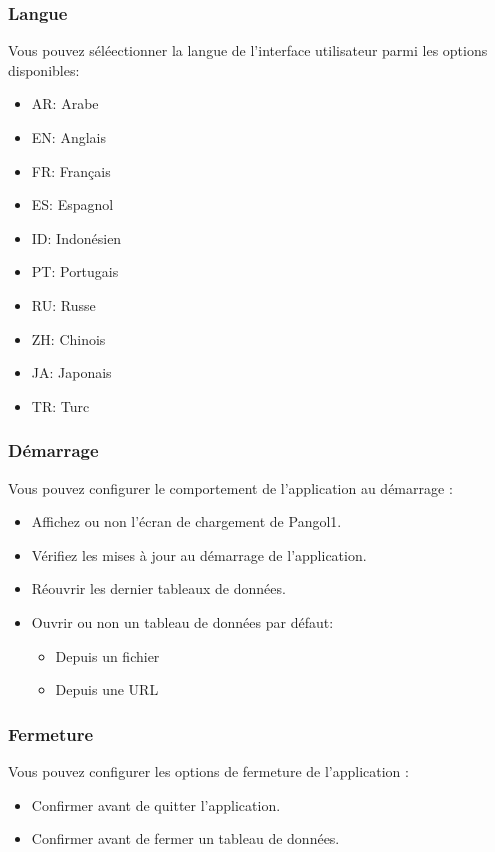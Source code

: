 \documentclass[11pt,a4paper]{article}
\begin{document}
\subsubsection*{Langue}
Vous pouvez s\'el\'eectionner la langue de l'interface utilisateur parmi les options disponibles:

\begin{itemize}
  \item AR: Arabe
  \item EN: Anglais
  \item FR: Fran\c{c}ais
  \item ES: Espagnol
  \item ID: Indon\'esien
  \item PT: Portugais
  \item RU: Russe
  \item ZH: Chinois
  \item JA: Japonais
  \item TR: Turc
\end{itemize}

\subsubsection*{D\'emarrage}
Vous pouvez configurer le comportement de l'application au d\'emarrage :

\begin{itemize}
  \item Affichez ou non l'\'ecran de chargement de Pangol1.
  \item V\'erifiez les mises \`a jour au d\'emarrage de l'application.
  \item R\'eouvrir les dernier tableaux de donn\'ees.
  \item Ouvrir ou non un tableau de donn\'ees par d\'efaut:
  \begin{itemize}
    \item Depuis un fichier
    \item Depuis une URL
  \end{itemize}
\end{itemize}

\subsubsection*{Fermeture}
Vous pouvez configurer les options de fermeture de l'application :

\begin{itemize}
  \item Confirmer avant de quitter l'application.
  \item Confirmer avant de fermer un tableau de donn\'ees.
\end{itemize}
\end{document}
